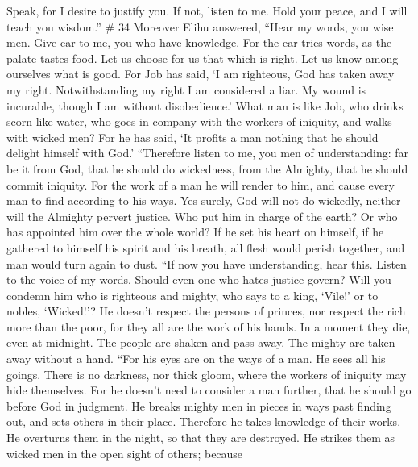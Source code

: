 Speak, for I desire to justify you.  If not, listen to me.
Hold your peace, and I will teach you wisdom.'' \# 34 
Moreover Elihu answered,  ``Hear my words, you wise men.
Give ear to me, you who have knowledge.  For the ear tries
words, as the palate tastes food.  Let us choose for us that
which is right. Let us know among ourselves what is good. 
For Job has said, `I am righteous, God has taken away my right.
 Notwithstanding my right I am considered a liar. My wound
is incurable, though I am without disobedience.'  What man
is like Job, who drinks scorn like water,  who goes in
company with the workers of iniquity, and walks with wicked men?
 For he has said, `It profits a man nothing that he should
delight himself with God.'  ``Therefore listen to me, you
men of understanding: far be it from God, that he should do wickedness,
from the Almighty, that he should commit iniquity.  For the
work of a man he will render to him, and cause every man to find
according to his ways.  Yes surely, God will not do
wickedly, neither will the Almighty pervert justice.  Who
put him in charge of the earth? Or who has appointed him over the whole
world?  If he set his heart on himself, if he gathered to
himself his spirit and his breath,  all flesh would perish
together, and man would turn again to dust.  ``If now you
have understanding, hear this. Listen to the voice of my words.
 Should even one who hates justice govern? Will you condemn
him who is righteous and mighty,  who says to a king,
`Vile!' or to nobles, `Wicked!'?  He doesn't respect the
persons of princes, nor respect the rich more than the poor, for they
all are the work of his hands.  In a moment they die, even
at midnight. The people are shaken and pass away. The mighty are taken
away without a hand.  ``For his eyes are on the ways of a
man. He sees all his goings.  There is no darkness, nor
thick gloom, where the workers of iniquity may hide themselves.
 For he doesn't need to consider a man further, that he
should go before God in judgment.  He breaks mighty men in
pieces in ways past finding out, and sets others in their place.
 Therefore he takes knowledge of their works. He overturns
them in the night, so that they are destroyed.  He strikes
them as wicked men in the open sight of others;  because
